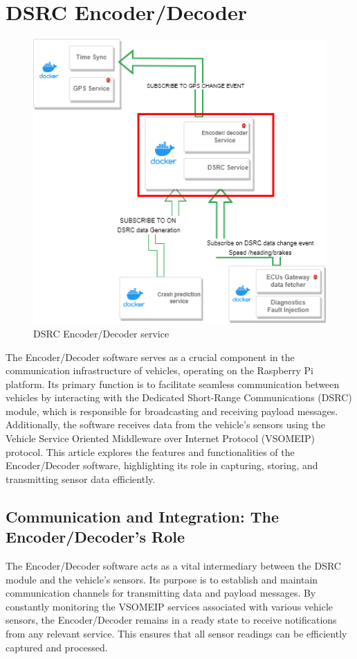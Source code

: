 \documentclass[
12pt,
oneside, 
onehalfspacing, 
nolistspacing, 
parskip, 
chapterinoneline, 
]{AASTCOMPUTER}
\begin{document}
\section{DSRC Encoder/Decoder}
\begin{figure}[!ht]
\centering
\includegraphics[scale=0.5]{Figures/30.png}
\caption[DSRC Encoder/Decoder service]{DSRC Encoder/Decoder service}
\label{fig:DSRC Encoder/Decoder}
\end{figure}
The Encoder/Decoder software serves as a crucial component in the communication infrastructure of vehicles, operating on the Raspberry Pi platform. Its primary function is to facilitate seamless communication between vehicles by interacting with the Dedicated Short-Range Communications (DSRC) module, which is responsible for broadcasting and receiving payload messages. Additionally, the software receives data from the vehicle's sensors using the Vehicle Service Oriented Middleware over Internet Protocol (VSOMEIP) protocol. This article explores the features and functionalities of the Encoder/Decoder software, highlighting its role in capturing, storing, and transmitting sensor data efficiently.

\subsection{Communication and Integration: The Encoder/Decoder's Role}
The Encoder/Decoder software acts as a vital intermediary between the DSRC module and the vehicle's sensors. Its purpose is to establish and maintain communication channels for transmitting data and payload messages. By constantly monitoring the VSOMEIP services associated with various vehicle sensors, the Encoder/Decoder remains in a ready state to receive notifications from any relevant service. This ensures that all sensor readings can be efficiently captured and processed.
\end{document}
